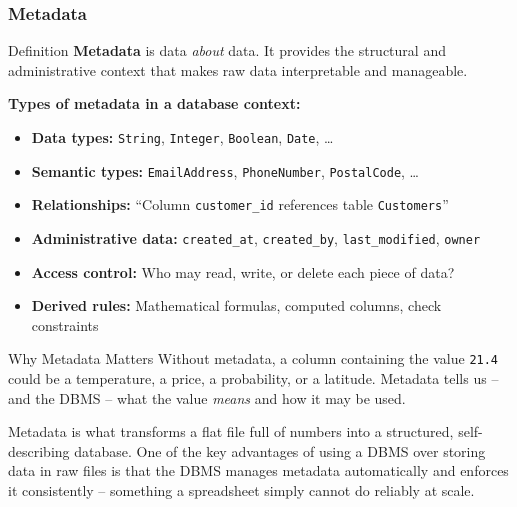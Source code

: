 \begin{frame}
  \frametitle{Metadata}

  \begin{block}{Definition}
    \textbf{Metadata} is data \emph{about} data. It provides the structural and administrative context that makes raw data interpretable and manageable.
  \end{block}

  \vspace{0.3em}
  \textbf{Types of metadata in a database context:}
  \begin{itemize}
    \item \textbf{Data types:} \texttt{String}, \texttt{Integer}, \texttt{Boolean}, \texttt{Date}, \ldots
    \item \textbf{Semantic types:} \texttt{EmailAddress}, \texttt{PhoneNumber}, \texttt{PostalCode}, \ldots
    \item \textbf{Relationships:} ``Column \texttt{customer\_id} references table \texttt{Customers}''
    \item \textbf{Administrative data:} \texttt{created\_at}, \texttt{created\_by}, \texttt{last\_modified}, \texttt{owner}
    \item \textbf{Access control:} Who may read, write, or delete each piece of data?
    \item \textbf{Derived rules:} Mathematical formulas, computed columns, check constraints
  \end{itemize}

  \vspace{0.3em}
  \begin{alertblock}{Why Metadata Matters}
    Without metadata, a column containing the value \texttt{21.4} could be a temperature, a price, a probability, or a latitude. Metadata tells us -- and the DBMS -- what the value \emph{means} and how it may be used.
  \end{alertblock}

  Metadata is what transforms a flat file full of numbers into a structured, self-describing database. One of the key advantages of using a DBMS over storing data in raw files is that the DBMS manages metadata automatically and enforces it consistently -- something a spreadsheet simply cannot do reliably at scale.
\end{frame}

